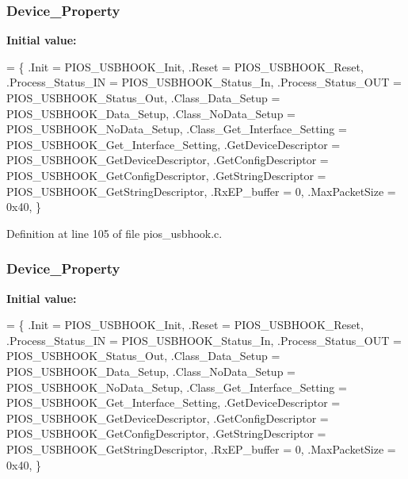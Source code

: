 \hypertarget{group___p_i_o_s___u_s_b_h_o_o_k_ga646bdfc60e69ee637f2c39b5bb91dfec}{
\subsubsection[{Device\-\_\-\-Property}]{ Device\-\_\-\-Property}}\label{group___p_i_o_s___u_s_b_h_o_o_k_ga646bdfc60e69ee637f2c39b5bb91dfec}
{\bfseries Initial value\-:}
\begin{DoxyCode}
= \{
        .Init                        = PIOS\_USBHOOK\_Init,
        .Reset                       = PIOS\_USBHOOK\_Reset,
        .Process\_Status\_IN           = PIOS\_USBHOOK\_Status\_In,
        .Process\_Status\_OUT          = PIOS\_USBHOOK\_Status\_Out,
        .Class\_Data\_Setup            = PIOS\_USBHOOK\_Data\_Setup,
        .Class\_NoData\_Setup          = PIOS\_USBHOOK\_NoData\_Setup,
        .Class\_Get\_Interface\_Setting = PIOS\_USBHOOK\_Get\_Interface\_Setting,
        .GetDeviceDescriptor         = PIOS\_USBHOOK\_GetDeviceDescriptor,
        .GetConfigDescriptor         = PIOS\_USBHOOK\_GetConfigDescriptor,
        .GetStringDescriptor         = PIOS\_USBHOOK\_GetStringDescriptor,
        .RxEP\_buffer                 = 0,
        .MaxPacketSize               = 0x40,
\}
\end{DoxyCode}


Definition at line 105 of file pios\-\_\-usbhook.\-c.

\hypertarget{group___p_i_o_s___u_s_b_h_o_o_k_ga646bdfc60e69ee637f2c39b5bb91dfec}{
\subsubsection[{Device\-\_\-\-Property}]{ Device\-\_\-\-Property}}\label{group___p_i_o_s___u_s_b_h_o_o_k_ga646bdfc60e69ee637f2c39b5bb91dfec}
{\bfseries Initial value\-:}
\begin{DoxyCode}
= \{
        .Init                        = PIOS\_USBHOOK\_Init,
        .Reset                       = PIOS\_USBHOOK\_Reset,
        .Process\_Status\_IN           = PIOS\_USBHOOK\_Status\_In,
        .Process\_Status\_OUT          = PIOS\_USBHOOK\_Status\_Out,
        .Class\_Data\_Setup            = PIOS\_USBHOOK\_Data\_Setup,
        .Class\_NoData\_Setup          = PIOS\_USBHOOK\_NoData\_Setup,
        .Class\_Get\_Interface\_Setting = PIOS\_USBHOOK\_Get\_Interface\_Setting,
        .GetDeviceDescriptor         = PIOS\_USBHOOK\_GetDeviceDescriptor,
        .GetConfigDescriptor         = PIOS\_USBHOOK\_GetConfigDescriptor,
        .GetStringDescriptor         = PIOS\_USBHOOK\_GetStringDescriptor,
        .RxEP\_buffer                 = 0,
        .MaxPacketSize               = 0x40,
\}
\end{DoxyCode}


